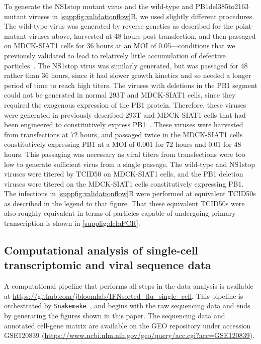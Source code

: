 \documentclass[10pt,letterpaper]{article}
\newcommand{\SUPPFIG}[1]{\autoref{suppfig:#1}}
\begin{document}
To generate the NS1stop mutant virus and the wild-type and PB1del385to2163 mutant viruses in \SUPPFIG{validationflow}B, we used slightly different procedures.
The wild-type virus was generated by reverse genetics as described for the point-mutant viruses above, harvested at 48 hours post-transfection, and then passaged on MDCK-SIAT1 cells for 36 hours at an MOI of 0.05---conditions that we previously validated to lead to relatively little accumulation of defective particles~\cite{russell2018extreme}.
The NS1stop virus was similarly generated, but was passaged for 48 rather than 36 hours, since it had slower growth kinetics and so needed a longer period of time to reach high titers.
The viruses with deletions in the PB1 segment could not be generated in normal 293T and MDCK-SIAT1 cells, since they required the exogenous expression of the PB1 protein.
Therefore, these viruses were generated in previously described 293T and MDCK-SIAT1 cells that had been engineered to constitutively express PB1~\cite{bloom2010permissive}.
These viruses were harvested from transfections at 72 hours, and passaged twice in the MDCK-SIAT1 cells constitutively expressing PB1 at a MOI of 0.001 for 72 hours and 0.01 for 48 hours. 
This passaging was necessary as viral titers from transfections were too low to generate sufficient virus from a single passage.
The wild-type and NS1stop viruses were titered by TCID50 on MDCK-SIAT1 cells, and the PB1 deletion viruses were titered on the MDCK-SIAT1 cells constitutively expressing PB1.
The infections in \SUPPFIG{validationflow}B were performed at equivalent TCID50s as described in the legend to that figure.
That these equivalent TCID50s were also roughly equivalent in terms of particles capable of undergoing primary transcription is shown in \SUPPFIG{delqPCR}.

\subsection*{Computational analysis of single-cell transcriptomic and viral sequence data}
A computational pipeline that performs all steps in the data analysis is available at \url{https://github.com/jbloomlab/IFNsorted_flu_single_cell}. 
This pipeline is orchestrated by \texttt{Snakemake}~\cite{koster2012snakemake}, and begins with the raw sequencing data and ends by generating the figures shown in this paper.
The sequencing data and annotated cell-gene matrix are available on the GEO repository under accession GSE120839 (\url{https://www.ncbi.nlm.nih.gov/geo/query/acc.cgi?acc=GSE120839}).
\end{document}
